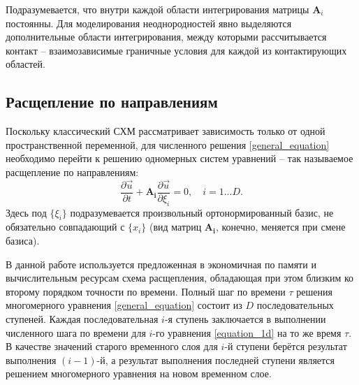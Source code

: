 \documentclass[a4paper]{article}
\numberwithin{equation}{section}
\begin{document}
Подразумевается, что внутри каждой области интегрирования матрицы $\mathbf{A}_i$
постоянны. Для моделирования неоднородностей явно выделяются дополнительные
области интегрирования, между которыми рассчитывается контакт -- взаимозависимые
граничные условия для каждой из контактирующих областей.


\subsection{Расщепление по направлениям}
Поскольку классический СХМ \cite{magomedov_kholodov_1988} 
рассматривает зависимость только от одной пространственной переменной,
для численного решения \eqref{general_equation} необходимо
перейти к решению одномерных систем уравнений -- так называемое расщепление по направлениям:
\begin{equation}
\label{equation_1d}
	\frac{\partial\vec{u}}{\partial{t}}+\mathbf{A_i}\frac{\partial\vec{u}}{\partial{\xi_i}} = 0, \quad i = 1 ... D.
\end{equation}
Здесь под $\{\xi_i\}$ подразумевается произвольный ортонормированный базис, 
не обязательно совпадающий с $\{x_i\}$ 
(вид матриц $\mathbf{A_i}$, конечно, меняется при смене базиса).

В данной работе используется предложенная в \cite{chelnokov}
экономичная по памяти и вычислительным ресурсам схема расщепления, 
обладающая при этом близким ко второму порядком точности по времени.
Полный шаг по времени $\tau$ решения многомерного уравнения \eqref{general_equation} 
состоит из $D$ последовательных ступеней. 
Каждая последовательная $i$-я ступень заключается в выполнении численного шага по времени
для $i$-го уравнения \eqref{equation_1d} на то же время $\tau$. 
В качестве значений старого временного слоя для $i$-й ступени 
берётся результат выполнения $(i-1)$-й, 
а результат выполнения последней ступени является решением 
многомерного уравнения на новом временном слое. 
\end{document}
